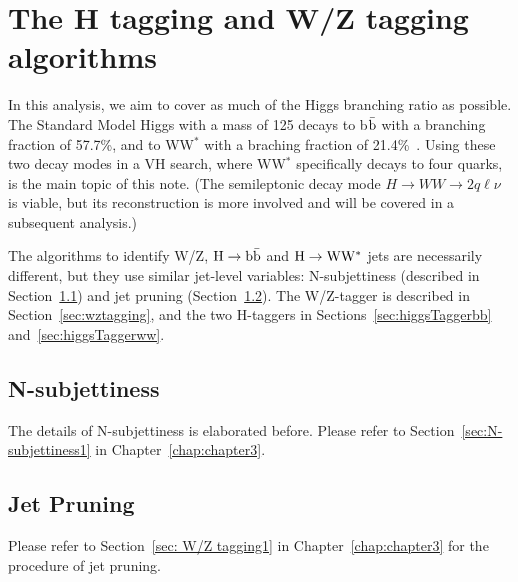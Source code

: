 \section{The H tagging and W/Z tagging algorithms}
\label{sec: H tagging}

In this
analysis, we aim to cover as much of the Higgs branching ratio as
possible.  The Standard Model Higgs with a mass of 125 \GeVcc decays
to b$\bar{\rm b}$ with a branching fraction of 57.7\%, and to WW$^*$
with a braching fraction of 21.4\%~\cite{pdg-higgs}.  Using these two
decay modes in a VH search, where WW$^*$ specifically decays to four
quarks, is the main topic of this note.  (The semileptonic decay mode
$ H \to WW \to 2q\ell \nu$ is viable, but its reconstruction is more
involved and will be covered in a subsequent analysis.)



The algorithms to identify W/Z, ${\rm H \to b\bar{b}}$ and 
${\rm H \to WW^*}$ jets are necessarily different, but they use similar
jet-level variables: N-subjettiness (described in
Section~\ref{sec:N-subjettiness}) and jet pruning
(Section~\ref{sec:jetPruning}).  The W/Z-tagger is described in
Section~\ref{sec:wztagging}, and the two H-taggers in
Sections~\ref{sec:higgsTaggerbb} and~\ref{sec:higgsTaggerww}.



\subsection{N-subjettiness}
\label{sec:N-subjettiness}

The details of N-subjettiness is elaborated before. Please refer to 
Section~\ref{sec:N-subjettiness1} in Chapter~\ref{chap:chapter3}. 



\subsection{Jet Pruning}
\label{sec:jetPruning}

Please refer to Section~\ref{sec: W/Z tagging1} in 
Chapter~\ref{chap:chapter3} for the procedure of jet pruning. 

